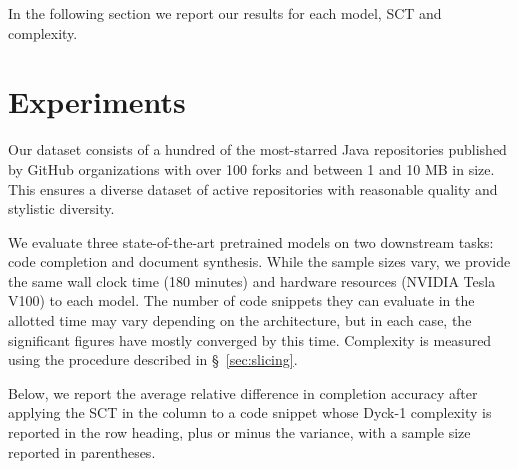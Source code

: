 \documentclass[sigconf,review,anonymous]{acmart}
\begin{document}
  In the following section we report our results for each model, SCT and complexity.

  \pagebreak\section{Experiments}\label{sec:results}
  Our dataset consists of a hundred of the most-starred Java repositories published by GitHub organizations with over 100 forks and between 1 and 10 MB in size. This ensures a diverse dataset of active repositories with reasonable quality and stylistic diversity.

  We evaluate three state-of-the-art pretrained models on two downstream tasks: code completion and document synthesis. While the sample sizes vary, we provide the same wall clock time (180 minutes) and hardware resources (NVIDIA Tesla V100) to each model. The number of code snippets they can evaluate in the allotted time may vary depending on the architecture, but in each case, the significant figures have mostly converged by this time. Complexity is measured using the procedure described in \S~\ref{sec:slicing}.

  Below, we report the average relative difference in completion accuracy after applying the SCT in the column to a code snippet whose Dyck-1 complexity is reported in the row heading, plus or minus the variance, with a sample size reported in parentheses.
\end{document}
